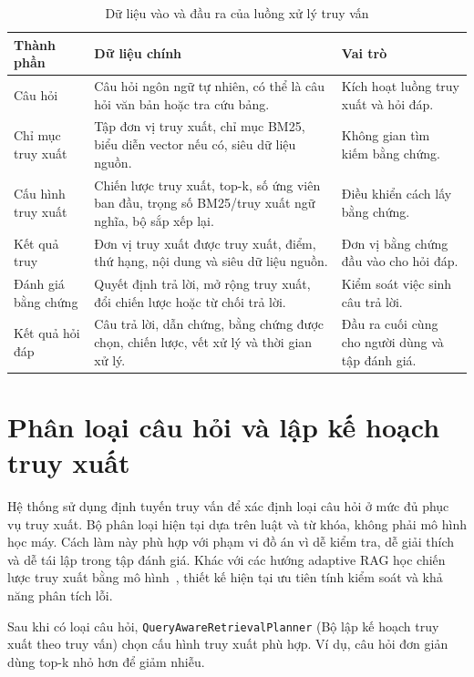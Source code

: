 \documentclass[../DoAn.tex]{subfiles}
\begin{document}
\begin{table}[H]
\centering
\small
\renewcommand{\arraystretch}{1.2}
\caption{Dữ liệu vào và đầu ra của luồng xử lý truy vấn}
\label{tab:query-input-output}
\begin{tabularx}{\textwidth}{
    |>{\raggedright\arraybackslash}p{}
    |>{\raggedright\arraybackslash}X
    |>{\raggedright\arraybackslash}p{}|
}
\hline
\textbf{Thành phần} & \textbf{Dữ liệu chính} & \textbf{Vai trò} \\
\hline
Câu hỏi &
Câu hỏi ngôn ngữ tự nhiên, có thể là câu hỏi văn bản hoặc tra cứu bảng. &
Kích hoạt luồng truy xuất và hỏi đáp. \\
\hline
Chỉ mục truy xuất &
Tập đơn vị truy xuất, chỉ mục BM25, biểu diễn vector nếu có, siêu dữ liệu nguồn. &
Không gian tìm kiếm bằng chứng. \\
\hline
Cấu hình truy xuất &
Chiến lược truy xuất, top-k, số ứng viên ban đầu, trọng số BM25/truy xuất ngữ nghĩa, bộ sắp xếp lại. &
Điều khiển cách lấy bằng chứng. \\
\hline
Kết quả truy  &
Đơn vị truy xuất được truy xuất, điểm, thứ hạng, nội dung và siêu dữ liệu nguồn. &
Đơn vị bằng chứng đầu vào cho hỏi đáp. \\
\hline
Đánh giá bằng chứng &
Quyết định trả lời, mở rộng truy xuất, đổi chiến lược hoặc từ chối trả lời. &
Kiểm soát việc sinh câu trả lời. \\
\hline
Kết quả hỏi đáp &
Câu trả lời, dẫn chứng, bằng chứng được chọn, chiến lược, vết xử lý và thời gian xử lý. &
Đầu ra cuối cùng cho người dùng và tập đánh giá. \\
\hline
\end{tabularx}
\end{table}

\section{Phân loại câu hỏi và lập kế hoạch truy xuất}
\label{section:query-router-planner-design}

Hệ thống sử dụng định tuyến truy vấn để xác định loại câu hỏi ở mức đủ phục vụ truy xuất.
Bộ phân loại hiện tại dựa trên luật và từ khóa, không phải mô hình học máy. Cách
làm này phù hợp với phạm vi đồ án vì dễ kiểm tra, dễ giải thích và dễ tái lập trong
tập đánh giá. Khác với các hướng adaptive RAG học chiến lược truy xuất bằng mô
hình~\cite{jeong2024adaptiverag}, thiết kế hiện tại ưu tiên tính kiểm soát và khả
năng phân tích lỗi.

Sau khi có loại câu hỏi, \texttt{QueryAwareRetrievalPlanner} (Bộ lập kế hoạch truy xuất theo truy vấn) chọn cấu hình truy
xuất phù hợp. Ví dụ, câu hỏi đơn giản
dùng top-k nhỏ hơn để giảm nhiễu.
\end{document}
